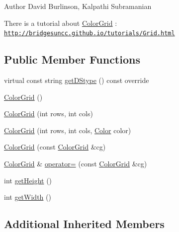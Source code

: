 \begin{DoxyAuthor}{Author}
David Burlinson, Kalpathi Subramanian
\end{DoxyAuthor}
There is a tutorial about \mbox{\hyperlink{classbridges_1_1datastructure_1_1_color_grid}{Color\+Grid}} \+: \href{http://bridgesuncc.github.io/tutorials/Grid.html}{\tt http\+://bridgesuncc.\+github.\+io/tutorials/\+Grid.\+html} \subsection*{Public Member Functions}
\begin{DoxyCompactItemize}
\item 
virtual const string \mbox{\hyperlink{classbridges_1_1datastructure_1_1_color_grid_afad945d648b427ca183a1dface8249b7}{get\+D\+Stype}} () const override
\item 
\mbox{\hyperlink{classbridges_1_1datastructure_1_1_color_grid_afe6bd7f8bf0dddd889ad7b6c159e928a}{Color\+Grid}} ()
\item 
\mbox{\hyperlink{classbridges_1_1datastructure_1_1_color_grid_a96a8df5eab72fb32c358ba12f2d4483b}{Color\+Grid}} (int rows, int cols)
\item 
\mbox{\hyperlink{classbridges_1_1datastructure_1_1_color_grid_a28f65f52274748d314ee47089e961c2c}{Color\+Grid}} (int rows, int cols, \mbox{\hyperlink{classbridges_1_1datastructure_1_1_color}{Color}} color)
\item 
\mbox{\hyperlink{classbridges_1_1datastructure_1_1_color_grid_adf9b21649638aec97394825d6d09f34c}{Color\+Grid}} (const \mbox{\hyperlink{classbridges_1_1datastructure_1_1_color_grid}{Color\+Grid}} \&cg)
\item 
\mbox{\hyperlink{classbridges_1_1datastructure_1_1_color_grid}{Color\+Grid}} \& \mbox{\hyperlink{classbridges_1_1datastructure_1_1_color_grid_abb8b358357bdccbd22fea5cea4a9862e}{operator=}} (const \mbox{\hyperlink{classbridges_1_1datastructure_1_1_color_grid}{Color\+Grid}} \&cg)
\item 
int \mbox{\hyperlink{classbridges_1_1datastructure_1_1_color_grid_ab437905ec904f941cd58d3393c3a5700}{get\+Height}} ()
\item 
int \mbox{\hyperlink{classbridges_1_1datastructure_1_1_color_grid_a46b358c31927e34f2068202e0cc23ae0}{get\+Width}} ()
\end{DoxyCompactItemize}
\subsection*{Additional Inherited Members}


